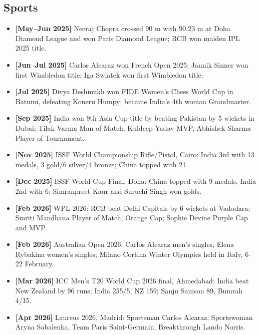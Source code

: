\documentclass[10pt,a4paper]{article}
\newcommand{\monthtag}[1]{\textbf{[#1]}}
\newcommand{\fact}[2]{\item \monthtag{#1} #2}
\begin{document}
\subsection{Sports}
\begin{itemize}
    \fact{May--Jun 2025}{Neeraj Chopra crossed 90 m with 90.23 m at Doha Diamond League and won Paris Diamond League; RCB won maiden IPL 2025 title.}
    \fact{Jun--Jul 2025}{Carlos Alcaraz won French Open 2025; Jannik Sinner won first Wimbledon title; Iga Swiatek won first Wimbledon title.}
    \fact{Jul 2025}{Divya Deshmukh won FIDE Women's Chess World Cup in Batumi, defeating Koneru Humpy; became India's 4th woman Grandmaster.}
    \fact{Sep 2025}{India won 9th Asia Cup title by beating Pakistan by 5 wickets in Dubai; Tilak Varma Man of Match, Kuldeep Yadav MVP, Abhishek Sharma Player of Tournament.}
    \fact{Nov 2025}{ISSF World Championship Rifle/Pistol, Cairo: India 3rd with 13 medals, 3 gold/6 silver/4 bronze; China topped with 21.}
    \fact{Dec 2025}{ISSF World Cup Final, Doha: China topped with 9 medals, India 2nd with 6; Simranpreet Kaur and Suruchi Singh won golds.}
    \fact{Feb 2026}{WPL 2026: RCB beat Delhi Capitals by 6 wickets at Vadodara; Smriti Mandhana Player of Match, Orange Cap; Sophie Devine Purple Cap and MVP.}
    \fact{Feb 2026}{Australian Open 2026: Carlos Alcaraz men's singles, Elena Rybakina women's singles; Milano Cortina Winter Olympics held in Italy, 6--22 February.}
    \fact{Mar 2026}{ICC Men's T20 World Cup 2026 final, Ahmedabad: India beat New Zealand by 96 runs; India 255/5, NZ 159; Sanju Samson 89, Bumrah 4/15.}
    \fact{Apr 2026}{Laureus 2026, Madrid: Sportsman Carlos Alcaraz, Sportswoman Aryna Sabalenka, Team Paris Saint-Germain, Breakthrough Lando Norris.}
\end{itemize}
\end{document}
